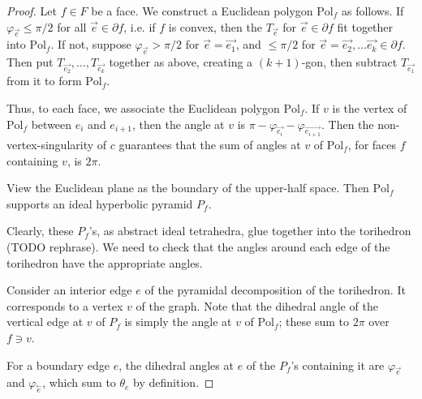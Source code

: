 \documentclass[11pt]{amsart}
\newcommand{\cev}[1]{\overset{\leftarrow}{#1}}
\newcommand{\del}{\partial}
\newcommand{\vphi}{\varphi}
\newcommand{\Pol}{{\text{Pol}}}
\theoremstyle{plain}
\theoremstyle{definition}
\begin{document}
\begin{proof}
Let $f \in F$ be a face.
We construct a Euclidean polygon $\Pol_f$ as follows.
If $\vphi_{\vec{e}} \leq \pi/2$ for all $\vec{e} \in \del f$,
i.e. if $f$ is convex, then 
the $T_{\vec{e}}$ for $\vec{e}\in \del f$
fit together into $\Pol_f$.
If not, suppose $\vphi_{\vec{e}} > \pi/2$
for $\vec{e} = \vec{e_1}$, 
and $\leq \pi/2$ for $\vec{e} = \vec{e_2},\ldots \vec{e_k} \in \del f$.
Then put $T_{\vec{e_2}},\ldots,T_{\vec{e_k}}$ together as above,
creating a $(k+1)$-gon,
then subtract $T_{\vec{e_1}}$ from it to form $\Pol_f$.

Thus, to each face, we associate the Euclidean polygon $\Pol_f$.
If $v$ is the vertex of $\Pol_f$ between $e_i$ and $e_{i+1}$,
then the angle at $v$ is
$\pi - \vphi_{\vec{e_i}} - \vphi_{\vec{e_{i+1}}}$.
Then the non-vertex-singularity of $c$ guarantees that
the sum of angles at $v$ of $\Pol_f$, for faces $f$ containing $v$,
is $2\pi$.


View the Euclidean plane as the boundary of the upper-half space.
Then $\Pol_f$ supports an ideal hyperbolic pyramid $P_f$.

Clearly, these $P_f$'s, as abstract ideal tetrahedra,
glue together into the torihedron (TODO rephrase).
We need to check that the angles around each edge of
the torihedron have the appropriate angles.


Consider an interior edge $e$ of the pyramidal decomposition
of the torihedron.
It corresponds to a vertex $v$ of the graph.
Note that the dihedral angle of the vertical edge
at $v$ of $P_f$ is simply the angle at $v$ of $\Pol_f$;
these sum to $2\pi$ over $f \ni v$.


For a boundary edge $e$, the dihedral angles at $e$ of the $P_f$'s
containing it are $\vphi_{\vec{e}}$ and $\vphi_{\cev{e}}$,
which sum to $\theta_e$ by definition.

\end{proof}




\end{document}
